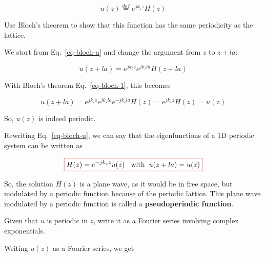 \begin{equation}
u(z) \stackrel{def}{=} e^{j k_z z} H(z) \label{eq-bloch-u}
\end{equation} 

\begin{cue}
Use Bloch's theorem to show that this function has the same periodicity as the lattice.
\end{cue}

\noindent{}We start from Eq.~\ref{eq-bloch-u} and change the argument from $z$ to $z+la$:

\begin{equation}
u(z+la)= e^{j k_z z} e^{j k_z l a} H(z + l a)
\end{equation} 

With Bloch's theorem Eq.~\ref{eq-bloch-1}, this becomes

\begin{equation}
u(z+l a)= e^{j k_z z} e^{j k_z l a} e^{-j k_z l a} H(z) = e^{j k_z z} H(z) = u(z)
\end{equation} 

So, $u(z)$ is indeed periodic.

Rewriting Eq.~\ref{eq-bloch-u}, we can say that the eigenfunctions of a 1D periodic system can be written as

\begin{equation}
\fbox{$\displaystyle  
    H(z) = e^{-j k_z z} u(z) \hspace{.3 cm} \textrm{with} \hspace{.2 cm} u(z+la) = u(z) \label{eq-bloch-state}
$}
\end{equation} 

So, the solution $H(z)$ is a plane wave, as it would be in free space, but modulated by a periodic function because of the periodic lattice. This plane wave modulated by a periodic function is called a \textbf{pseudoperiodic function}.

\begin{cue}
  Given that $u$ is periodic in $z$, write it as a Fourier series involving complex exponentials.
\end{cue} 

Writing $u(z)$ as a Fourier series, we get

